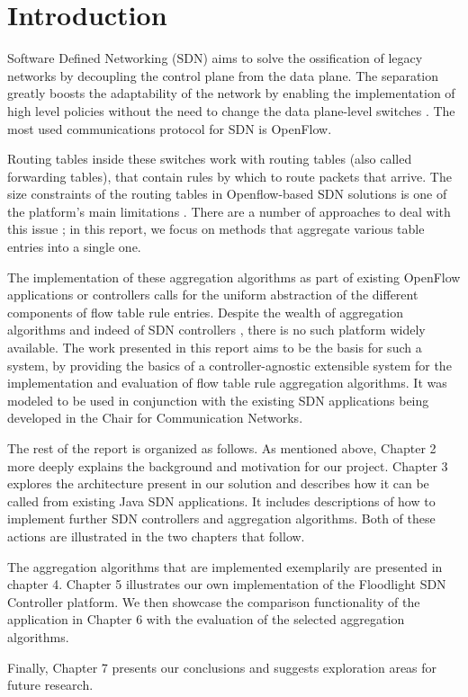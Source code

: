 \chapter{Introduction}

Software Defined Networking (SDN) aims to solve the ossification of legacy networks by decoupling the control plane from the data plane. The separation greatly boosts the adaptability of the network by enabling the implementation of high level policies without the need to change the data plane-level switches \cite{Benzekki2016}. The most used communications protocol for SDN is OpenFlow.

Routing tables inside these switches work with routing tables (also called forwarding tables), that contain rules by which to route packets that arrive. The size constraints of the routing tables in Openflow-based SDN solutions is one of the platform's main limitations \cite{Benzekki2016} \cite{Luo2015}. There are a number of approaches to deal with this issue \cite{Nguyen2016}; in this report, we focus on methods that aggregate various table entries into a single one. 

The implementation of these aggregation algorithms as part of existing OpenFlow applications or controllers calls for the uniform abstraction of the different components of flow table rule entries. 
Despite the wealth of aggregation algorithms and indeed of SDN controllers \cite{Nunes2014}, there is no such platform widely available. The work presented in this report aims to be the basis for such a system, by providing the basics of a controller-agnostic extensible system for the implementation and evaluation of flow table rule aggregation algorithms. It was modeled to be used in conjunction with the existing SDN applications being developed in the Chair for Communication Networks.

The rest of the report is organized as follows. As mentioned above, Chapter 2 more deeply explains the background and motivation for our project. Chapter 3 explores the architecture present in our solution and describes how it can be called from existing Java SDN applications. It includes descriptions of how to implement further SDN controllers and aggregation algorithms. Both of these actions are illustrated in the two chapters that follow. 

The aggregation algorithms that are implemented exemplarily are presented in chapter 4. Chapter 5 illustrates our own implementation of the Floodlight SDN Controller platform. We then showcase the comparison functionality of the application in Chapter 6 with the evaluation of the selected aggregation algorithms. 

Finally, Chapter 7 presents our conclusions and suggests exploration areas for future research.

